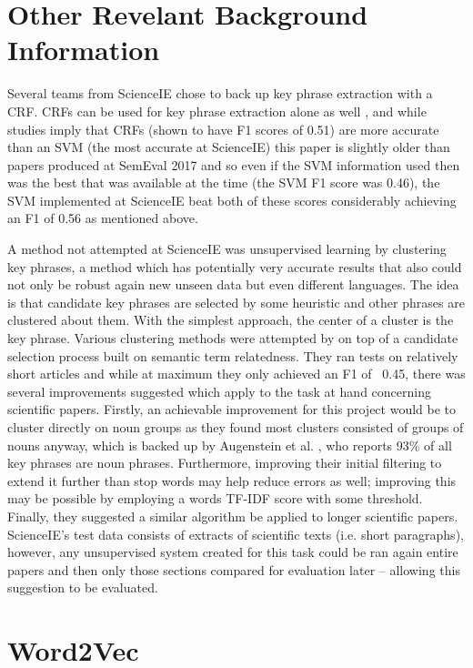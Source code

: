 \section{Other Revelant Background Information}

Several teams from ScienceIE chose to back up key phrase extraction with a CRF. CRFs can be used for key phrase extraction alone as well \cite{Zhang2008}, and while studies imply that CRFs (shown to have F1 scores of 0.51) are more accurate than an SVM (the most accurate at ScienceIE) this paper is slightly older than papers produced at SemEval 2017 and so even if the SVM information used then was the best that was available at the time (the SVM F1 score was 0.46), the SVM implemented at ScienceIE beat both of these scores considerably achieving an F1 of 0.56 as mentioned above.

A method not attempted at ScienceIE was unsupervised learning by clustering key phrases, a method which has potentially very accurate results that also could not only be robust again new unseen data but even different languages. The idea is that candidate key phrases are selected by some heuristic and other phrases are clustered about them. With the simplest approach, the center of a cluster is the key phrase. Various clustering methods were attempted by \cite{Liu2009} on top of a candidate selection process built on semantic term relatedness. They ran tests on relatively short articles and while at maximum they only achieved an F1 of ~0.45, there was several improvements suggested which apply to the task at hand concerning scientific papers. Firstly, an achievable improvement for this project would be to cluster directly on noun groups as they found most clusters consisted of groups of nouns anyway, which is backed up by Augenstein et al. \cite{Augenstein2017}, who reports 93\% of all key phrases are noun phrases. Furthermore, improving their initial filtering to extend it further than stop words may help reduce errors as well; improving this may be possible by employing a words TF-IDF score with some threshold. Finally, they suggested a similar algorithm be applied to longer scientific papers. ScienceIE’s test data consists of extracts of scientific texts (i.e. short paragraphs), however, any unsupervised system created for this task could be ran again entire papers and then only those sections compared for evaluation later – allowing this suggestion to be evaluated.

\section{Word2Vec}

